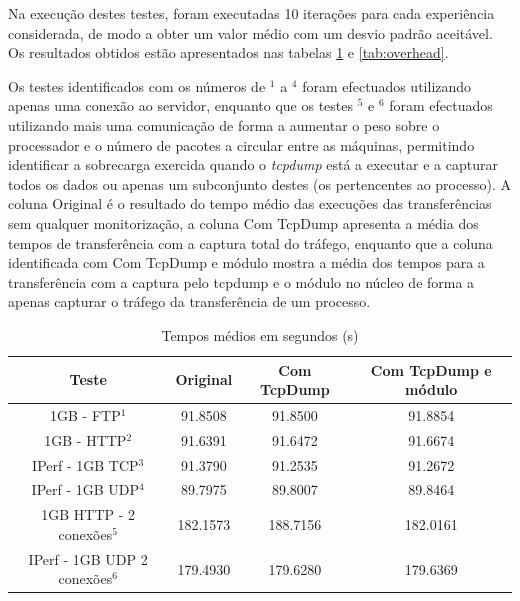 \documentclass[a4paper]{llncs}
\begin{document}
Na execução destes testes, foram executadas 10 iterações para cada experiência considerada, de modo a obter um valor médio com um desvio padrão aceitável. Os resultados obtidos estão apresentados nas tabelas \ref{tab:desempenho} e \ref{tab:overhead}.

Os testes identificados com os números de $^{1}$ a $^{4}$ foram efectuados utilizando apenas uma conexão ao servidor, enquanto que os testes $^{5}$ e $^{6}$ foram efectuados utilizando mais uma comunicação de forma a aumentar o peso sobre o processador e o número de pacotes a circular entre as máquinas, permitindo identificar a sobrecarga exercida quando o \textit{tcpdump} está a executar e a capturar todos os dados ou apenas um subconjunto destes (os pertencentes ao processo). A coluna Original é o resultado do tempo médio das execuções das transferências sem qualquer monitorização, a coluna Com TcpDump apresenta a média dos tempos de transferência com a captura total do tráfego, enquanto que a coluna identificada com Com TcpDump e módulo mostra a média dos tempos para a transferência com a captura pelo tcpdump e o módulo no núcleo de forma a apenas capturar o tráfego da transferência de um processo.

\begin{table}
\begin{center}

\begin{tabular}{ | c | c | c | c |  }
\hline
Teste & \hspace {0.3cm} Original \hspace {0.3cm}& \hspace {0.2cm} Com TcpDump \hspace {0.2cm} & Com TcpDump e módulo \\
\hline
1GB - FTP$^{1}$ & 91.8508	& 91.8500 & 91.8854 \\
1GB - HTTP$^{2}$ & 91.6391 & 91.6472 & 91.6674 \\ 
IPerf - 1GB TCP$^{3}$ & 91.3790	& 91.2535	& 91.2672 \\
IPerf - 1GB UDP$^{4}$ & 89.7975 & 89.8007 & 89.8464 \\
\hline
\hline
1GB HTTP - 2 conexões$^{5}$ & 182.1573 & 188.7156 & 182.0161 \\
IPerf - 1GB UDP 2 conexões$^{6}$ & 179.4930 & 179.6280 & 179.6369 \\
\hline
\end{tabular}
\caption{Tempos médios em segundos (s)}
\label{tab:desempenho}
\end{center}
\end{table}
\end{document}
